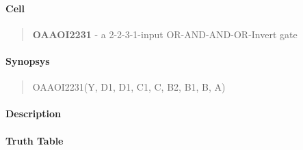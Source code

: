 \label{OAAOI2231}
\paragraph{Cell}
\begin{quote}
    \textbf{OAAOI2231} - a 2-2-3-1-input OR-AND-AND-OR-Invert gate
\end{quote}

\paragraph{Synopsys}
\begin{quote}
    OAAOI2231(Y, D1, D1, C1, C, B2, B1, B, A)
\end{quote}

\paragraph{Description}

%

\paragraph{Truth Table}
%

